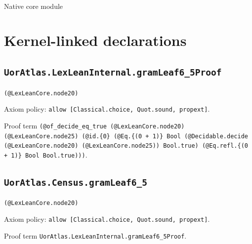 \documentclass[11pt]{article}
\begin{document}
\begin{center}{\LARGE Native core module}\end{center}
\section*{Kernel-linked declarations}
\subsection*{\texttt{UorAtlas.LexLeanInternal.gramLeaf6\_5Proof}}
\noindent\texttt{(@LexLeanCore.node20)}\par
\noindent Axiom policy: \texttt{allow [Classical.choice, Quot.sound, propext]}.\par
\noindent Proof term \texttt{(@of\_decide\_eq\_true (@LexLeanCore.node20) (@LexLeanCore.node25) (@id.\{0\} (@Eq.\{(0 + 1)\} Bool (@Decidable.decide (@LexLeanCore.node20) (@LexLeanCore.node25)) Bool.true) (@Eq.refl.\{(0 + 1)\} Bool Bool.true)))}.\par
\subsection*{\texttt{UorAtlas.Census.gramLeaf6\_5}}
\noindent\texttt{(@LexLeanCore.node20)}\par
\noindent Axiom policy: \texttt{allow [Classical.choice, Quot.sound, propext]}.\par
\noindent Proof term \texttt{UorAtlas.LexLeanInternal.gramLeaf6\_5Proof}.\par
\end{document}
